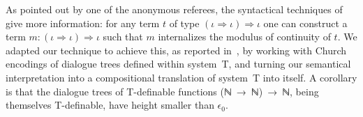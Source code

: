 \documentclass{entcs} \usepackage{prentcsmacro}
\newcommand{\AgdaC}[1]{\mbox{#1}}
\begin{document}
As pointed out by one of the anonymous referees, the syntactical
techniques of~\cite{MR0325352} give more information: for any term $t$
of type $(\iota \Rightarrow \iota) \Rightarrow \iota$ one can
construct a term $m : (\iota \Rightarrow \iota) \Rightarrow \iota$
such that $m$ internalizes the modulus of continuity of $t$. We
adapted our technique to achieve this, as reported
in~\cite{escardo:dialogue}, by working with Church encodings of
dialogue trees defined within system~T, and turning our semantical
interpretation into a compositional translation of system~T into
itself. A corollary is that the dialogue trees of T-definable
functions \AgdaC{(ℕ → ℕ) → ℕ}, being themselves T-definable, have
height smaller than $\epsilon_0$.



% 
% 
\end{document}
